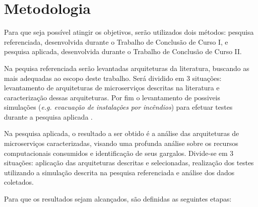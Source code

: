 \section{Metodologia}
\label{met}

Para que seja poss\'{i}vel atingir os objetivos, serão utilizados dois métodos: pesquisa referenciada, desenvolvida durante o Trabalho de Conclusão de Curso I, e pesquisa aplicada, desenvolvida durante o Trabalho de Conclusão de Curso II.

Na pequisa referenciada serão levantadas arquiteturas da literatura, buscando as mais adequadas ao escopo deste trabalho. Será dividido em 3 situações: levantamento de arquiteturas de microserviços descritas na literatura e caracterização dessas arquiteturas. Por fim o levantamento de possiveis simulações (\textit{e.g. evacuação de instalações por incêndios}) para efetuar testes durante a pesquisa aplicada .

Na pesquisa aplicada, o resultado a ser obtido é a análise das arquiteturas de microserviços caracterizadas, visando uma profunda análise sobre os recursos computacionais consumidos e identificação de seus gargalos. Divide-se em 3 situações: aplicação das arquiteturas descritas e selecionadas, realização dos testes utilizando a simulação descrita na pesquisa referenciada e análise dos dados coletados.

Para que os resultados sejam alcançados, são definidas as seguintes etapas:

